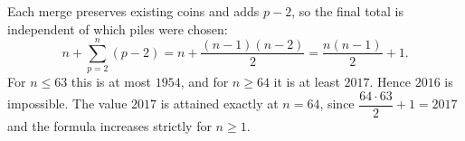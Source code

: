Each merge preserves existing coins and adds $p-2$, so the final total is independent of which piles were chosen:
\[n+\sum_{p=2}^{n}(p-2)=n+\dfrac{(n-1)(n-2)}{2}=\dfrac{n(n-1)}{2}+1.\]
For $n\le63$ this is at most $1954$, and for $n\ge64$ it is at least $2017$. Hence $2016$ is impossible. The value $2017$ is attained exactly at $\boxed{n=64}$, since $\dfrac{64\cdot63}{2}+1=2017$ and the formula increases strictly for $n\ge1$.
